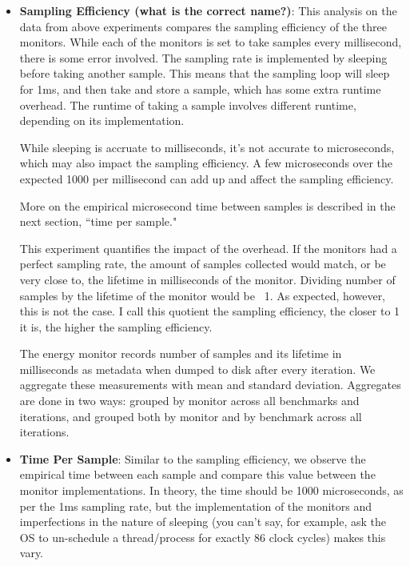     \begin{itemize}
        \item \textbf{Sampling Efficiency (what is the correct name?)}:
            This analysis on the data from above experiments compares the sampling efficiency of the three monitors. While each of the monitors is set to take samples every millisecond, there is some error involved. The sampling rate is implemented by sleeping before taking another sample. This means that the sampling loop will sleep for 1ms, and then take and store a sample, which has some extra runtime overhead.  The runtime of taking a sample involves different runtime, depending on its implementation.
            
            While sleeping is accruate to milliseconds, it's not accurate to microseconds, which may also impact the sampling efficiency. A few microseconds over the expected 1000 per millisecond can add up and affect the sampling efficiency.
            
            More on the empirical microsecond time between samples is described in the next section, ``time per sample."
            
            This experiment quantifies the impact of the overhead. If the monitors had a perfect sampling rate, the amount of samples collected would match, or be very close to, the lifetime in milliseconds of the monitor. Dividing number of samples by the lifetime of the monitor would be ~1. As expected, however, this is not the case. I call this quotient the sampling efficiency, the closer to 1 it is, the higher the sampling efficiency.
            
            The energy monitor records number of samples and its lifetime in milliseconds as metadata when dumped to disk after every iteration. We aggregate these measurements with mean and standard deviation. Aggregates are done in two ways: grouped by monitor across all benchmarks and iterations, and grouped both by monitor and by benchmark across all iterations. 
        
        \item \textbf{Time Per Sample}:
            Similar to the sampling efficiency, we observe the empirical time between each sample and compare this value between the monitor implementations. In theory, the time should be 1000 microseconds, as per the 1ms sampling rate, but the implementation of the monitors and imperfections in the nature of sleeping (you can't say, for example, ask the OS to un-schedule a thread/process for exactly 86 clock cycles) makes this vary.
            

\end{itemize}
